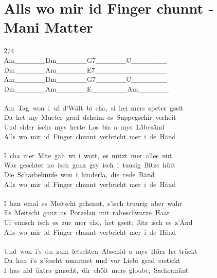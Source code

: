 \documentclass[]{book}
\let\stdsection\section
\renewcommand\section{\clearpage\stdsection}
\begin{document}
\hypertarget{alls-wo-mir-id-finger-chunnt---mani-matter}{%
\section{Alls wo mir id Finger chunnt - Mani Matter}\label{alls-wo-mir-id-finger-chunnt---mani-matter}}

2/4\\
\textbar Am\_\_\_\_\_\_\textbar Dm\_\_\_\_\_\_\textbar G7\_\_\_\_\_\_\textbar C\_\_\_\_\_\_\_\textbar{}\\
\textbar Dm\_\_\_\_\_\_\textbar Am\_\_\_\_\_\_\textbar E7\_\_\_\_\_\_\textbar\_\_\_\_\_\_\_\_\textbar{}\\
\textbar Am\_\_\_\_\_\_\textbar Dm\_\_\_\_\_\_\textbar G7\_\_\_\_\_\_\textbar C\_\_\_\_\_\_\_\textbar{}\\
\textbar Dm\_\_\_\_\_\_\textbar Am\_\_\_\_\_\_\textbar E\_\_\_\_\_\_\_\textbar Am\_\_\_\_\_\_\textbar~\\
~\\
Am~Tag~won~i~uf~d'Wält~bi~cho,~si~hei~mers~speter~gseit\\
Da~het~my~Mueter~grad~deheim~es~Suppegschir~verheit\\
Und~sider~ischs~mys~herte~Los~bis~a~mys~Läbesänd\\
Alls~wo~mir~id~Finger~chunnt~verbricht~mer~i~de~Händ\\
~\\
I~cha~mer~Müe~gäh~wi~i~wott,~es~nützt~mer~alles~nüt\\
Was~geschter~no~isch~ganz~gsy~isch~i~tuusig~Bitze~hütt\\
Die~Schärbehüüfe~won~i~hinderla,~die~rede~Bänd\\
Alls~wo~mir~id~Finger~chunnt~verbricht~mer~i~de~Händ\\
~\\
I~han~emal~es~Meitschi~gchennt,~s'isch~truurig~aber~wahr\\
Es~Meitschi~ganz~us~Porzelan~mit~rabeschwarze~Haar\\
Uf~einisch~isch~es~zue~mer~cho,~het~gseit:~Jitz~isch~es~z'Änd\\
Alls~wo~mir~id~Finger~chunnt~verbricht~mer~i~de~Händ\\
~\\
Und~won~i's~du~zum~letschten~Abschid~a~mys~Härz~ha~trückt\\
Da~han~i's~z'fescht~umarmet~und~vor~Liebi~grad~erstickt\\
I~has~nid~äxtra~gmacht,~dir~chöit~mers~gloube,~Sackermänt\\
\end{document}
